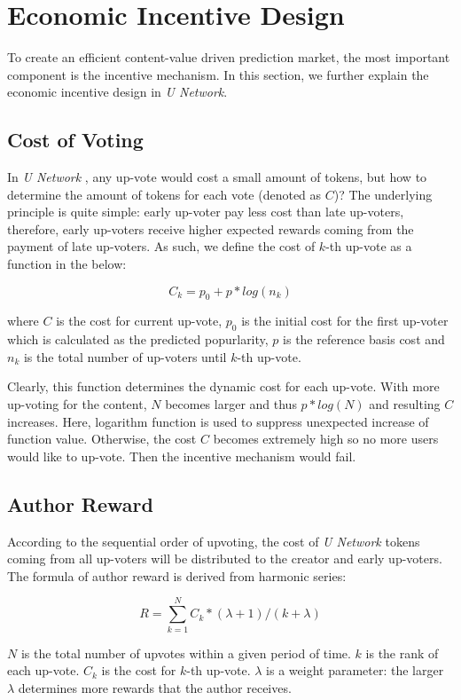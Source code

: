 \section{Economic Incentive Design}
To create an efficient content-value driven prediction market, the most important component is the incentive mechanism. In this section, we further explain the economic incentive design in \emph{U Network}.

\subsection{Cost of Voting}
In \emph{U Network} , any up-vote would cost a small amount of tokens, but how to determine the amount of tokens for each vote (denoted as $C$)? The underlying principle is quite simple: early up-voter pay less cost than late up-voters, therefore, early up-voters receive higher expected rewards coming from the payment of late up-voters. As such, we define the cost of $k$-th up-vote as a function in the below:
 \begin{center}
$$C_{k} = p_0 + p * log(n_{k})$$
\end{center}
where $C$ is the cost for current up-vote, $p_0$ is the initial cost for the first up-voter which is calculated as the predicted popurlarity, $p$ is the reference basis cost and $n_{k}$ is the total number of up-voters until $k$-th up-vote. 

Clearly, this function determines the dynamic cost for each up-vote.  With more up-voting for the content, $N$ becomes larger and thus $p * log(N)$ and resulting $C$ increases.  Here, logarithm function is used to suppress unexpected increase of function value. Otherwise, the cost $C$ becomes extremely high so no more users would like to up-vote. Then the incentive mechanism would fail.

\subsection{Author Reward}
According to the sequential order of upvoting, the cost of \emph{U Network} tokens coming from all up-voters will be distributed to the creator and early up-voters. The formula of author reward is derived from harmonic series: 
\begin{center}
$$R = \sum_{k=1}^{N}  C_{k} * (\lambda + 1)/{(k + \lambda)}$$
\end{center}
$N$ is the total number of upvotes within a given period of time. $k$ is the rank of each up-vote. $C_{k}$ is the cost for $k$-th up-vote. $\lambda$ is a weight parameter: the larger $\lambda$ determines more rewards that the author receives. 

